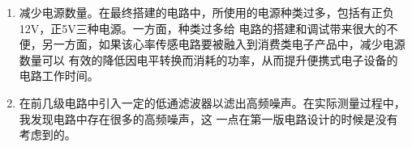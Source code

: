 \documentclass{article}
\begin{document}
\begin{spacing}{1.5}
\begin{enumerate}
        \item 减少电源数量。在最终搭建的电路中，所使用的电源种类过多，包括有正负12V，正5V三种电源。一方面，种类过多给
        电路的搭建和调试带来很大的不便，另一方面，如果该心率传感电路要被融入到消费类电子产品中，减少电源数量可以
        有效的降低因电平转换而消耗的功率，从而提升便携式电子设备的电路工作时间。

        \item 在前几级电路中引入一定的低通滤波器以滤出高频噪声。在实际测量过程中，我发现电路中存在很多的高频噪声，这
        一点在第一版电路设计的时候是没有考虑到的。

    \end{enumerate}

\end{spacing}
\end{document}
